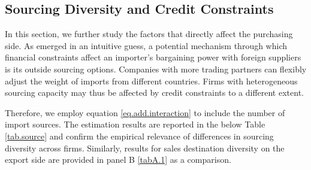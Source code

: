 \documentclass[12pt]{article}
\begin{document}
\subsection{Sourcing Diversity and Credit Constraints}

In this section, we further study the factors that directly affect the purchasing side. As emerged in an intuitive guess, a potential mechanism through which financial constraints affect an importer's bargaining power with foreign suppliers is its outside sourcing options. Companies with more trading partners can flexibly adjust the weight of imports from different countries. Firms with heterogeneous sourcing capacity may thus be affected by credit constraints to a different extent. 

Therefore, we employ equation \ref{eq.add.interaction} to include the number of import sources. The estimation results are reported in the below Table \ref{tab.source} and confirm the empirical relevance of differences in sourcing diversity across firms. Similarly, results for sales destination diversity on the export side are provided in panel B \ref{tabA.1} as a comparison.
\end{document}
